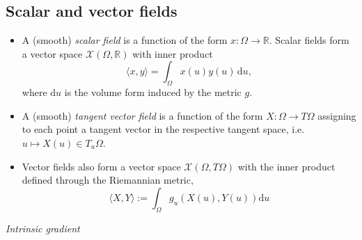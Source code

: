 \documentclass[12pt]{article}
\numberwithin{equation}{section}
\theoremstyle{definition}
\newcommand{		\R		}	{	\mathbb{R}				}
\newcommand{		\cX		}	{	\mathcal{X}				}
\newcommand{		\n		}	{	\noindent					} %
\newcommand{		\ra		}	{	\rangle					}
\newcommand{		\la		}	{	\langle					}
\newcommand{		\Oh		}	{	\Omega					}
\newcommand{		\1		}	{	\bm{1}					}%
\begin{document}
\subsection{Scalar and vector fields}

\begin{itemize}
\item A (smooth) \emph{scalar field} is a function of the form $x : \Omega \to \mathbb{R}$. Scalar fields form a vector space $\cX(\Oh, \R)$ with inner product
$$
\la x, y \ra = \int_\Oh x(u) y(u) \, \textrm{d} u,
$$
where $\textrm{d}u$ is the volume form induced by the metric $g$. 
\item A (smooth) \emph{tangent vector field} is a function of the form $X : \Omega \to T\Omega$ assigning to each point a tangent vector in the respective tangent space, i.e. $u \mapsto X(u) \in T_u\Oh$.
\item Vector fields also form a vector space $\cX(\Omega, T\Omega)$ with the inner product defined through the Riemannian metric,
$$
\la X, Y \ra := \int _ \Oh g_u(X(u), Y(u)) \textrm{d} u
$$
\end{itemize}


\n\hrulefill 
\emph{ Intrinsic gradient }
\hrulefill
\end{document}
